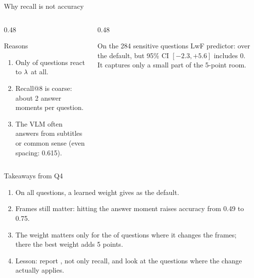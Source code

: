 \documentclass[aspectratio=169,11pt]{beamer}
\begin{document}
\begin{frame}{Why recall is not accuracy}
  \begin{columns}[T,onlytextwidth]
    \begin{column}{0.48\textwidth}
      \begin{block}{Reasons}
        \begin{enumerate}
          \item Only  of questions react to $\lambda$ at all.
          \item Recall@8 is coarse: about 2 answer moments per question.
          \item The VLM often answers from subtitles or common sense (even spacing: 0.615).
        \end{enumerate}
      \end{block}
    \end{column}
    \begin{column}{0.48\textwidth}
      \begin{alertblock}{On the 284 sensitive questions}
        LwF predictor:  over the default, but 95\% CI $[-2.3,+5.6]$ includes 0. It captures only a small part of the 5-point room.
      \end{alertblock}
    \end{column}
  \end{columns}
\end{frame}

\begin{frame}{Takeaways from Q4}
  \begin{enumerate}
    \item On all questions, a learned weight gives  as the default.
    \vspace{2mm}
    \item Frames still matter: hitting the answer moment raises accuracy from 0.49 to 0.75.
    \vspace{2mm}
    \item The weight matters only for the  of questions where it changes the frames; there the best weight adds 5 points.
    \vspace{2mm}
    \item Lesson: report , not only recall, and look at the questions where the change actually applies.
  \end{enumerate}
\end{frame}

\thankframe
\end{document}
